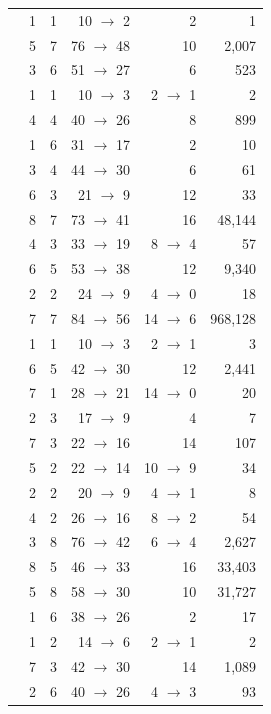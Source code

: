 \begin{longtable}{@{}L{4.4cm} r r r r r@{}}
 & 1 & 1 & 10 $\to$ 2 & 2 & 1 \\
 & 5 & 7 & 76 $\to$ 48 & 10 & 2,007 \\
 & 3 & 6 & 51 $\to$ 27 & 6 & 523 \\
 & 1 & 1 & 10 $\to$ 3 & 2 $\to$ 1 & 2 \\
 & 4 & 4 & 40 $\to$ 26 & 8 & 899 \\
 & 1 & 6 & 31 $\to$ 17 & 2 & 10 \\
 & 3 & 4 & 44 $\to$ 30 & 6 & 61 \\
 & 6 & 3 & 21 $\to$ 9 & 12 & 33 \\
 & 8 & 7 & 73 $\to$ 41 & 16 & 48,144 \\
 & 4 & 3 & 33 $\to$ 19 & 8 $\to$ 4 & 57 \\
 & 6 & 5 & 53 $\to$ 38 & 12 & 9,340 \\
 & 2 & 2 & 24 $\to$ 9 & 4 $\to$ 0 & 18 \\
 & 7 & 7 & 84 $\to$ 56 & 14 $\to$ 6 & 968,128 \\
 & 1 & 1 & 10 $\to$ 3 & 2 $\to$ 1 & 3 \\
 & 6 & 5 & 42 $\to$ 30 & 12 & 2,441 \\
 & 7 & 1 & 28 $\to$ 21 & 14 $\to$ 0 & 20 \\
 & 2 & 3 & 17 $\to$ 9 & 4 & 7 \\
 & 7 & 3 & 22 $\to$ 16 & 14 & 107 \\
 & 5 & 2 & 22 $\to$ 14 & 10 $\to$ 9 & 34 \\
 & 2 & 2 & 20 $\to$ 9 & 4 $\to$ 1 & 8 \\
 & 4 & 2 & 26 $\to$ 16 & 8 $\to$ 2 & 54 \\
 & 3 & 8 & 76 $\to$ 42 & 6 $\to$ 4 & 2,627 \\
 & 8 & 5 & 46 $\to$ 33 & 16 & 33,403 \\
 & 5 & 8 & 58 $\to$ 30 & 10 & 31,727 \\
 & 1 & 6 & 38 $\to$ 26 & 2 & 17 \\
 & 1 & 2 & 14 $\to$ 6 & 2 $\to$ 1 & 2 \\
 & 7 & 3 & 42 $\to$ 30 & 14 & 1,089 \\
 & 2 & 6 & 40 $\to$ 26 & 4 $\to$ 3 & 93 \\

\end{longtable}
